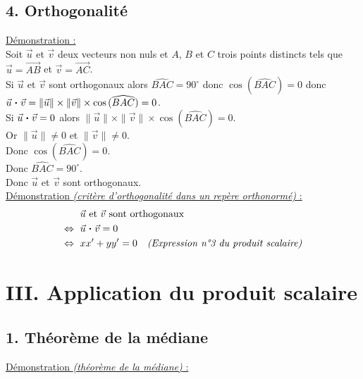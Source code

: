 \documentclass[11pt,a4paper]{article}
\newcommand{\pdt}{\mathbin{\vcenter{\hbox{\scalebox{0.6}{\textbullet}}}}}
\begin{document}
\subsection*{4. Orthogonalité}

\underline{Démonstration :} ~\\

Soit $\vec{u}$ et $\vec{v}$ deux vecteurs non nuls et $A$, $B$ et $C$ trois points distincts tels que $\vec{u}=\overrightarrow{AB}$ et $\vec{v}=\overrightarrow{AC}$. \\

Si $\vec{u}$ et $\vec{v}$ sont orthogonaux alors $\widehat{BAC}=90^\circ$ donc $\cos{(\widehat{BAC})}=0$ donc $\vec{u}\pdt\vec{v}=\|\vec{u}\|\times\|\vec{v}\|\times\cos{(\widehat{BAC})}=0$. \\

Si $\vec{u}\pdt\vec{v}=0$ alors $\|\vec{u}\|\times\|\vec{v}\|\times\cos{(\widehat{BAC})}=0$. \\
Or $\|\vec{u}\|\not=0$ et $\|\vec{v}\|\not=0$. \\
Donc $\cos{(\widehat{BAC})}=0$. \\
Donc $\widehat{BAC}=90^\circ$. \\

Donc  $\vec{u}$ et $\vec{v}$ sont orthogonaux. \\


\underline{Démonstration \emph{(critère d'orthogonalité dans un repère orthonormé)} :}
\begin{align*}
    &\vec{u} \text{ et } \vec{v} \text{ sont orthogonaux} \\
    \Leftrightarrow\text{ }&\vec{u}\pdt\vec{v}=0 \\
    \Leftrightarrow\text{ }&xx'+yy'=0 \quad \text{\emph{(Expression n°3 du produit scalaire)}}
\end{align*}

\newpage

\section*{III. Application du produit scalaire}

\subsection*{1. Théorème de la médiane}


\underline{Démonstration \emph{(théorème de la médiane)} :}
\end{document}
